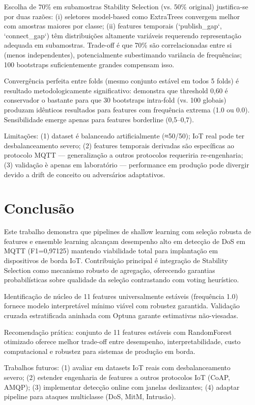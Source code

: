 \documentclass[12pt]{article}
\begin{document}
Escolha de 70\% em subamostras Stability Selection (vs. 50\% original) justifica-se por duas razões: (i) seletores model-based como ExtraTrees convergem melhor com amostras maiores por classe; (ii) features temporais (`publish\_gap`, `connect\_gap`) têm distribuições altamente variáveis requerendo representação adequada em subamostras. Trade-off é que 70\% são correlacionadas entre si (menos independentes), potencialmente subestimando variância de frequências; 100 bootstraps suficientemente grandes compensam isso.

Convergência perfeita entre folds (mesmo conjunto estável em todos 5 folds) é resultado metodologicamente significativo: demonstra que threshold 0,60 é conservador o bastante para que 30 bootstraps intra-fold (vs. 100 globais) produzam idênticos resultados para features com frequência extrema (1.0 ou 0.0). Sensibilidade emerge apenas para features borderline (0,5–0,7).

Limitações: (1) dataset é balanceado artificialmente (≈50/50); IoT real pode ter desbalanceamento severo; (2) features temporais derivadas são específicas ao protocolo MQTT — generalização a outros protocolos requeriria re-engenharia; (3) validação è apenas em laboratório — performance em produção pode divergir devido a drift de conceito ou adversários adaptativos.


\section{Conclusão}

Este trabalho demonstra que pipelines de shallow learning com seleção robusta de features e ensemble learning alcançam desempenho alto em detecção de DoS em MQTT (F1=0,97125) mantendo viabilidade total para implantação em dispositivos de borda IoT. Contribuição principal é integração de Stability Selection como mecanismo robusto de agregação, oferecendo garantias probabilísticas sobre qualidade da seleção contrastando com voting heurístico.

Identificação de núcleo de 11 features universalmente estáveis (frequência 1.0) fornece modelo interpretável mínimo viável com robustez garantida. Validação cruzada estratificada aninhada com Optuna garante estimativas não-viesadas.

Recomendação prática: conjunto de 11 features estáveis com RandomForest otimizado oferece melhor trade-off entre desempenho, interpretabilidade, custo computacional e robustez para sistemas de produção em borda.

Trabalhos futuros: (1) avaliar em datasets IoT reais com desbalanceamento severo; (2) estender engenharia de features a outros protocolos IoT (CoAP, AMQP); (3) implementar detecção online com janelas deslizantes; (4) adaptar pipeline para ataques multiclasse (DoS, MitM, Intrusão).




\end{document}
